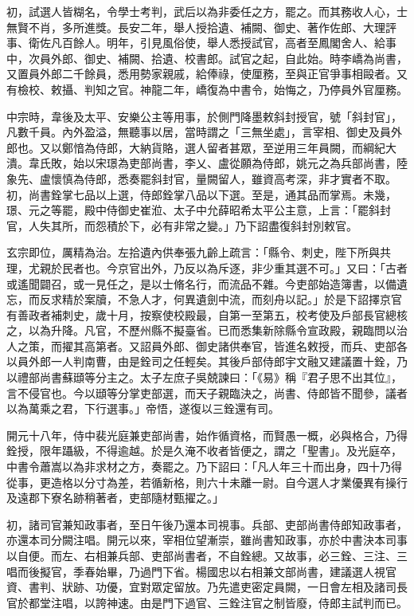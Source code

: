 \begin{pinyinscope}
 初，試選人皆糊名，令學士考判，武后以為非委任之方，罷之。而其務收人心，士無賢不肖，多所進獎。長安二年，舉人授拾遺、補闕、御史、著作佐郎、大理評事、衛佐凡百餘人。明年，引見風俗使，舉人悉授試官，高者至鳳閣舍人、給事中，次員外郎、御史、補闕、拾遺、校書郎。試官之起，自此始。時李嶠為尚書，又置員外郎二千餘員，悉用勢家親戚，給俸祿，使厘務，至與正官爭事相毆者。又有檢校、敕攝、判知之官。神龍二年，嶠復為中書令，始悔之，乃停員外官厘務。



 中宗時，韋後及太平、安樂公主等用事，於側門降墨敕斜封授官，號「斜封官」，凡數千員。內外盈溢，無聽事以居，當時謂之「三無坐處」，言宰相、御史及員外郎也。又以鄭愔為侍郎，大納貨賂，選人留者甚眾，至逆用三年員闕，而綱紀大潰。韋氏敗，始以宋璟為吏部尚書，李乂、盧從願為侍郎，姚元之為兵部尚書，陸象先、盧懷慎為侍郎，悉奏罷斜封官，量闕留人，雖資高考深，非才實者不取。初，尚書銓掌七品以上選，侍郎銓掌八品以下選。至是，通其品而掌焉。未幾，璟、元之等罷，殿中侍御史崔涖、太子中允薛昭希太平公主意，上言：「罷斜封官，人失其所，而怨積於下，必有非常之變。」乃下詔盡復斜封別敕官。



 玄宗即位，厲精為治。左拾遺內供奉張九齡上疏言：「縣令、刺史，陛下所與共理，尤親於民者也。今京官出外，乃反以為斥逐，非少重其選不可。」又曰：「古者或遙聞闢召，或一見任之，是以士脩名行，而流品不雜。今吏部始造簿書，以備遺忘，而反求精於案牘，不急人才，何異遺劍中流，而刻舟以記。」於是下詔擇京官有善政者補刺史，歲十月，按察使校殿最，自第一至第五，校考使及戶部長官總核之，以為升降。凡官，不歷州縣不擬臺省。已而悉集新除縣令宣政殿，親臨問以治人之策，而擢其高第者。又詔員外郎、御史諸供奉官，皆進名敕授，而兵、吏部各以員外郎一人判南曹，由是銓司之任輕矣。其後戶部侍郎宇文融又建議置十銓，乃以禮部尚書蘇頲等分主之。太子左庶子吳兢諫曰：「《易》稱『君子思不出其位』，言不侵官也。今以頲等分掌吏部選，而天子親臨決之，尚書、侍郎皆不聞參，議者以為萬乘之君，下行選事。」帝悟，遂復以三銓還有司。



 開元十八年，侍中裴光庭兼吏部尚書，始作循資格，而賢愚一概，必與格合，乃得銓授，限年躡級，不得逾越。於是久淹不收者皆便之，謂之「聖書」。及光庭卒，中書令蕭嵩以為非求材之方，奏罷之。乃下詔曰：「凡人年三十而出身，四十乃得從事，更造格以分寸為差，若循新格，則六十未離一尉。自今選人才業優異有操行及遠郡下寮名跡稍著者，吏部隨材甄擢之。」



 初，諸司官兼知政事者，至日午後乃還本司視事。兵部、吏部尚書侍郎知政事者，亦還本司分闕注唱。開元以來，宰相位望漸崇，雖尚書知政事，亦於中書決本司事以自便。而左、右相兼兵部、吏部尚書者，不自銓總。又故事，必三銓、三注、三唱而後擬官，季春始畢，乃過門下省。楊國忠以右相兼文部尚書，建議選人視官資、書判、狀跡、功優，宜對眾定留放。乃先遣吏密定員闕，一日會左相及諸司長官於都堂注唱，以誇神速。由是門下過官、三銓注官之制皆廢，侍郎主試判而已。




\end{pinyinscope}
